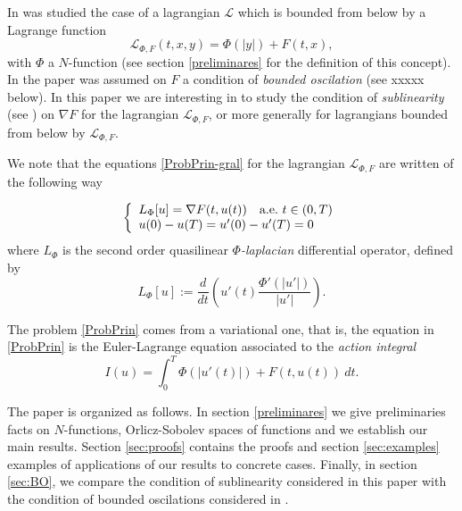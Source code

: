 \documentclass[twoside]{article}
\theoremstyle{remark}
\newcounter{example}
\begin{document}
In \cite{ABGMS2015} was studied the case of a lagrangian $\mathcal{L}$ which is bounded from below by a Lagrange function
\begin{equation}\label{eq:lagrange_phi}
\mathcal{L}_{\Phi,F}(t,x,y)=\Phi(|y|)+F(t,x),
\end{equation}
with $\Phi$ a $N$-function (see section \ref{preliminares} for the definition of this concept).  In the paper \cite{ABGMS2015} was assumed on $F$  a condition of \emph{bounded oscilation} (see xxxxx below). In this paper we are interesting in to study the condition of \emph{sublinearity} (see  \cite{tang1998periodic,wu1999periodic,zhao2004periodic,tang2010periodic,zhao2005existence}) on $\nabla F$ for the lagrangian  $\mathcal{L}_{\Phi,F}$, or more generally for lagrangians bounded from below by $\mathcal{L}_{\Phi,F}$.

We note that the equations \eqref{ProbPrin-gral} for the lagrangian $\mathcal{L}_{\Phi,F}$ are written of the following way

\begin{equation}\label{ProbPrin}
    \left\{%
\begin{array}{ll}
    L_{\Phi}[u]= \nabla F(t,u(t)) \quad \hbox{a.e.}\ t \in (0,T)\\
    u(0)-u(T)=u'(0)-u'(T)=0
\end{array}%
\right.
\end{equation}
where $L_{\Phi}$ is the second order quasilinear  \emph{$\Phi$-laplacian} differential operator, defined by
\[L_{\Phi}[u]:=\frac{d}{dt}\left(u'(t)\frac{\Phi'(|u'|)}{|u'|}\right). \]




The problem \eqref{ProbPrin} comes from a variational one, that is,  the equation in  \eqref{ProbPrin}  is the Euler-Lagrange equation associated to the \emph{action integral}
\begin{equation}\label{integral_accion}
I(u)=\int_{0}^T \Phi(|u'(t)|)+F(t,u(t))\ dt.
\end{equation}

The paper is organized as follows. In section \ref{preliminares} we give preliminaries facts on $N$-functions, Orlicz-Sobolev spaces of functions and we establish our main results. Section \ref{sec:proofs} contains the proofs and section \ref{sec:examples} examples of applications of our results to concrete cases. Finally, in section \ref{sec:BO}, we compare the condition of sublinearity considered in this paper with the condition of bounded oscilations considered in \cite{ABGMS2015}.
\end{document}
